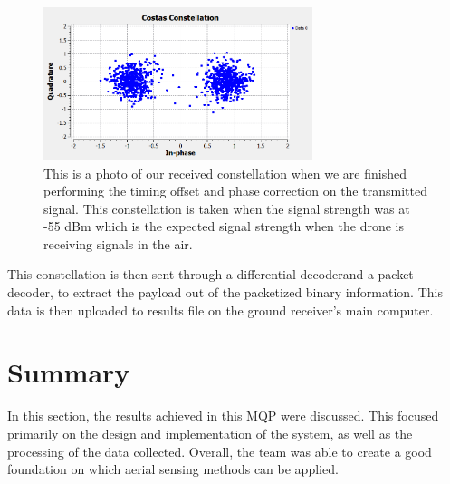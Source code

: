 \begin{figure}[h]
  \centering
  \includegraphics[width=0.70\textwidth]{img/constellation.PNG}
  \caption{This is a photo of our received constellation when we are finished performing the timing offset and phase correction on the transmitted signal.  This constellation is taken when the signal strength was at -55 dBm which is the expected signal strength when the drone is receiving signals in the air.}
  \label{fig:constellation}
\end{figure}

This constellation is then sent through a differential decoderand a packet decoder, to extract the payload out of the packetized binary information. This data is then uploaded to results file on the ground receiver’s main computer.

\section{Summary}
In this section, the results achieved in this MQP were discussed. This focused primarily on the design and implementation of the system, as well as the processing of the data collected. Overall, the team was able to create a good foundation on which aerial sensing methods can be applied.
